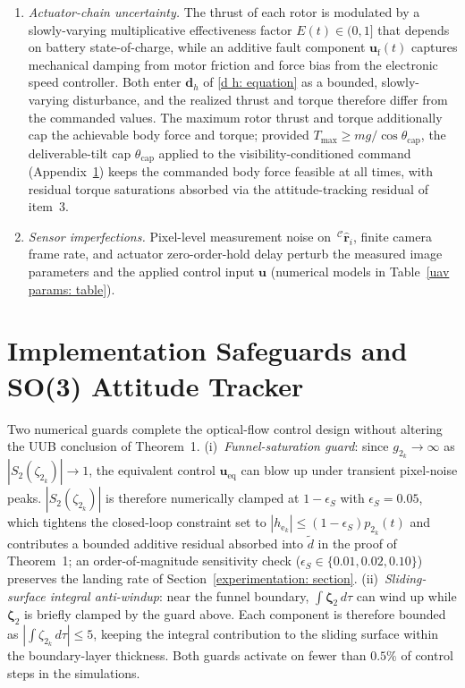 \documentclass{IEEEtaes}
\begin{document}
\begin{enumerate}
    \item \emph{Actuator-chain uncertainty.} The thrust of each rotor is modulated by a slowly-varying multiplicative effectiveness factor $E(t)\in(0,1]$ that depends on battery state-of-charge, while an additive fault component $\boldsymbol{u}_\text{f}(t)$ captures mechanical damping from motor friction and force bias from the electronic speed controller. Both enter $\boldsymbol{d}_h$ of \eqref{d h: equation} as a bounded, slowly-varying disturbance, and the realized thrust and torque therefore differ from the commanded values. The maximum rotor thrust and torque additionally cap the achievable body force and torque; provided $T_\text{max}\ge mg/\cos\theta_\text{cap}$, the deliverable-tilt cap $\theta_\text{cap}$ applied to the visibility-conditioned command (Appendix~\ref{implementation appendix: section}) keeps the commanded body force feasible at all times, with residual torque saturations absorbed via the attitude-tracking residual of item~3.
    \item \emph{Sensor imperfections.} Pixel-level measurement noise on $\,^\mathcal{C}\hat{\boldsymbol{r}}_i$, finite camera frame rate, and actuator zero-order-hold delay perturb the measured image parameters and the applied control input $\boldsymbol{u}$ (numerical models in Table~\ref{uav params: table}).
\end{enumerate}

\section{Implementation Safeguards and SO(3) Attitude Tracker} \label{implementation appendix: section}
Two numerical guards complete the optical-flow control design without altering the UUB conclusion of Theorem~1. (i)~\emph{Funnel-saturation guard}: since $g_{2_k}\to\infty$ as $|S_2(\zeta_{2_k})|\to 1$, the equivalent control $\boldsymbol{u}_\text{eq}$ can blow up under transient pixel-noise peaks. $|S_2(\zeta_{2_k})|$ is therefore numerically clamped at $1-\epsilon_S$ with $\epsilon_S=0.05$, which tightens the closed-loop constraint set to $|h_{\text{e}_k}|\le(1-\epsilon_S)p_{2_k}(t)$ and contributes a bounded additive residual absorbed into $\tilde{d}$ in the proof of Theorem~1; an order-of-magnitude sensitivity check ($\epsilon_S\in\{0.01,0.02,0.10\}$) preserves the landing rate of Section~\ref{experimentation: section}. (ii)~\emph{Sliding-surface integral anti-windup}: near the funnel boundary, $\int\boldsymbol{\zeta}_2\,d\tau$ can wind up while $\boldsymbol{\zeta}_2$ is briefly clamped by the guard above. Each component is therefore bounded as $|\!\int\!\zeta_{2_k}\,d\tau|\le 5$, keeping the integral contribution to the sliding surface within the boundary-layer thickness. Both guards activate on fewer than $0.5\%$ of control steps in the simulations.
\end{document}
